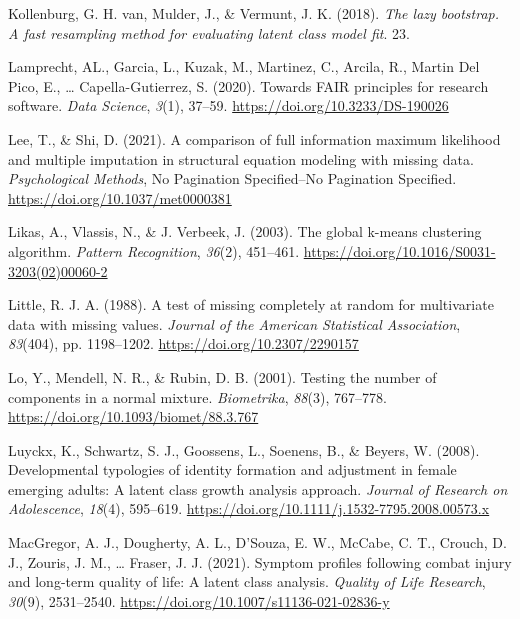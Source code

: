 \documentclass[
  ,man,floatsintext]{apa6}
\newlength{\cslhangindent}
\newlength{\cslentryspacingunit} %
\newenvironment{CSLReferences}[2] %
 {%
  \setlength{\parindent}{0pt}
  \ifodd #1
  \let\oldpar\par
  \def\par{\hangindent=\cslhangindent\oldpar}
  \fi
  \setlength{\parskip}{#2\cslentryspacingunit}
 }%
 {}
\begin{document}
\begin{CSLReferences}{1}{0}
\leavevmode{}%
Kollenburg, G. H. van, Mulder, J., \& Vermunt, J. K. (2018). \emph{The lazy bootstrap. A fast resampling method for evaluating latent class model fit}. 23.

\leavevmode{}%
Lamprecht, AL., Garcia, L., Kuzak, M., Martinez, C., Arcila, R., Martin Del Pico, E., \ldots{} Capella-Gutierrez, S. (2020). Towards {FAIR} principles for research software. \emph{Data Science}, \emph{3}(1), 37--59. \url{https://doi.org/10.3233/DS-190026}

\leavevmode{}%
Lee, T., \& Shi, D. (2021). A comparison of full information maximum likelihood and multiple imputation in structural equation modeling with missing data. \emph{Psychological Methods}, No Pagination Specified--No Pagination Specified. \url{https://doi.org/10.1037/met0000381}

\leavevmode{}%
Likas, A., Vlassis, N., \& J. Verbeek, J. (2003). The global k-means clustering algorithm. \emph{Pattern Recognition}, \emph{36}(2), 451--461. \url{https://doi.org/10.1016/S0031-3203(02)00060-2}

\leavevmode{}%
Little, R. J. A. (1988). A test of missing completely at random for multivariate data with missing values. \emph{Journal of the American Statistical Association}, \emph{83}(404), pp. 1198--1202. \url{https://doi.org/10.2307/2290157}

\leavevmode{}%
Lo, Y., Mendell, N. R., \& Rubin, D. B. (2001). Testing the number of components in a normal mixture. \emph{Biometrika}, \emph{88}(3), 767--778. \url{https://doi.org/10.1093/biomet/88.3.767}

\leavevmode{}%
Luyckx, K., Schwartz, S. J., Goossens, L., Soenens, B., \& Beyers, W. (2008). Developmental typologies of identity formation and adjustment in female emerging adults: A latent class growth analysis approach. \emph{Journal of Research on Adolescence}, \emph{18}(4), 595--619. \url{https://doi.org/10.1111/j.1532-7795.2008.00573.x}

\leavevmode{}%
MacGregor, A. J., Dougherty, A. L., D'Souza, E. W., McCabe, C. T., Crouch, D. J., Zouris, J. M., \ldots{} Fraser, J. J. (2021). Symptom profiles following combat injury and long-term quality of life: A latent class analysis. \emph{Quality of Life Research}, \emph{30}(9), 2531--2540. \url{https://doi.org/10.1007/s11136-021-02836-y}


\end{CSLReferences}
\end{document}
